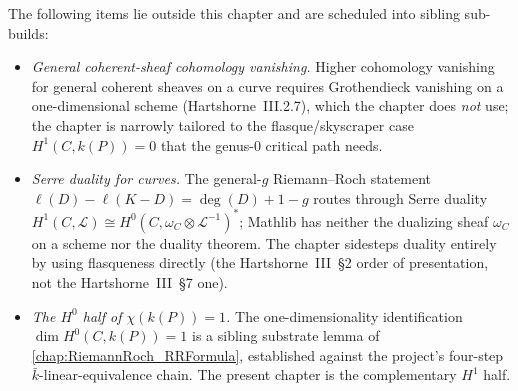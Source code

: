 The following items lie outside this chapter and are scheduled into
sibling sub-builds:
\begin{itemize}
  \item \emph{General coherent-sheaf cohomology vanishing.} Higher
    cohomology vanishing for general coherent sheaves on a curve
    requires Grothendieck vanishing on a one-dimensional scheme
    (Hartshorne~III.2.7), which the chapter does \emph{not} use; the
    chapter is narrowly tailored to the flasque/skyscraper case
    \(H^1(C, k(P)) = 0\) that the genus-\(0\) critical path needs.
  \item \emph{Serre duality for curves.} The general-\(g\) Riemann--Roch
    statement \(\ell(D) - \ell(K - D) = \deg(D) + 1 - g\) routes through
    Serre duality \(H^1(C, \mathcal L) \cong H^0(C, \omega_C \otimes
    \mathcal L^{-1})^*\); Mathlib has neither the dualizing sheaf
    \(\omega_C\) on a scheme nor the duality theorem. The chapter
    sidesteps duality entirely by using flasqueness directly (the
    Hartshorne~III~\S2 order of presentation, not the
    Hartshorne~III~\S7 one).
  \item \emph{The \(H^0\) half of \(\chi(k(P)) = 1\).} The
    one-dimensionality identification \(\dim H^0(C, k(P)) = 1\) is a
    sibling substrate lemma of \cref{chap:RiemannRoch_RRFormula},
    established against the project's four-step
    \(\bar k\)-linear-equivalence chain. The present chapter is the
    complementary \(H^1\) half.
\end{itemize}

